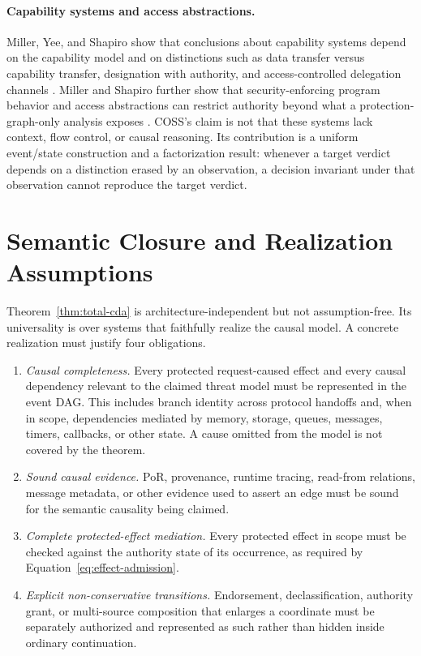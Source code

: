 \documentclass[10pt,twocolumn]{article}
\newcommand{\Model}{\textnormal{\textsc{COSS}}\xspace}
\begin{document}
\paragraph{Capability systems and access abstractions.}
Miller, Yee, and Shapiro show that conclusions about capability systems depend
on the capability model and on distinctions such as data transfer versus
capability transfer, designation with authority, and access-controlled
delegation channels \cite{miller_yee_shapiro2003}.  Miller and Shapiro further
show that security-enforcing program behavior and access abstractions can
restrict authority beyond what a protection-graph-only analysis exposes
\cite{miller_shapiro2003}.  \Model's claim is not that these systems lack
context, flow control, or causal reasoning.  Its contribution is a uniform
event/state construction and a factorization result: whenever a target verdict
depends on a distinction erased by an observation, a decision invariant under
that observation cannot reproduce the target verdict.



\section{Semantic Closure and Realization Assumptions}

Theorem~\ref{thm:total-cda} is architecture-independent but not assumption-free.
Its universality is over systems that faithfully realize the causal model.  A
concrete realization must justify four obligations.
\begin{enumerate}[leftmargin=*]
  \item \emph{Causal completeness.} Every protected request-caused effect and
        every causal dependency relevant to the claimed threat model must be
        represented in the event DAG.  This includes branch identity across
        protocol handoffs and, when in scope, dependencies mediated by memory,
        storage, queues, messages, timers, callbacks, or other state.  A cause
        omitted from the model is not covered by the theorem.
  \item \emph{Sound causal evidence.} PoR, provenance, runtime tracing,
        read-from relations, message metadata, or other evidence used to assert
        an edge must be sound for the semantic causality being claimed.
  \item \emph{Complete protected-effect mediation.} Every protected effect in
        scope must be checked against the authority state of its occurrence, as
        required by Equation~\eqref{eq:effect-admission}.
  \item \emph{Explicit non-conservative transitions.} Endorsement,
        declassification, authority grant, or multi-source composition that
        enlarges a coordinate must be separately authorized and represented as
        such rather than hidden inside ordinary continuation.
\end{enumerate}
\end{document}
